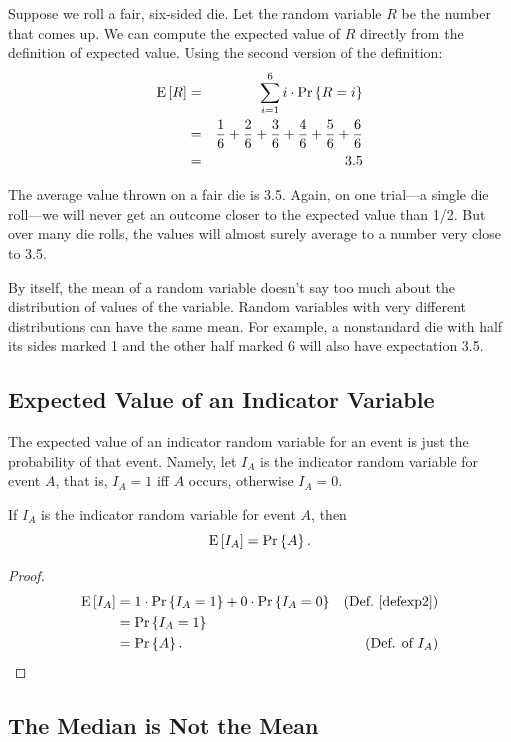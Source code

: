 \documentclass[11pt,twoside]{article}
\begin{document}
Suppose we roll a fair, six-sided die.  Let the random variable $R$ be
the number that comes up.  We can compute the expected value of $R$
directly from the definition of expected value.
Using the second version of the definition:
\begin{eqnarray*}
\mathop{\textup{E}}\nolimits\left[R\right]  & = &   \sum_{i=1}^6 i \cdot \mathop{\textup{Pr}}\nolimits\left\{R = i\right\} \\
        & = &   \frac{1}{6} + \frac{2}{6} + \frac{3}{6} +
                \frac{4}{6} + \frac{5}{6} + \frac{6}{6} \\
        & = &   3.5
\end{eqnarray*}

The average value thrown on a fair die is 3.5.  Again, on one trial---a
single die roll---we will never get an outcome closer to the expected
value than 1/2.  But over many die rolls, the values will almost surely
average to a number very close to 3.5.

By itself, the mean of a random variable doesn't say too much about the
distribution of values of the variable.  Random variables with very
different distributions can have the same mean.  For example, a
nonstandard die with half its sides marked 1 and the other half marked 6
will also have expectation 3.5.

\subsection{Expected Value of an Indicator Variable}

The expected value of an indicator random variable for an event is just
the probability of that event.  Namely, let $I_A$ is the indicator random
variable for event $A$, that is, $I_A = 1$ iff $A$ occurs, otherwise $I_A
= 0$.
\begin{lemma}\label{expindic}
If $I_A$ is the indicator random variable for event $A$, then
\[
\mathop{\textup{E}}\nolimits\left[I_A\right] = \mathop{\textup{Pr}}\nolimits\left\{A\right\}.
\]
\end{lemma}

\begin{proof}
\begin{align*}
\mathop{\textup{E}}\nolimits\left[I_A\right] & =  1 \cdot \mathop{\textup{Pr}}\nolimits\left\{I_A = 1\right\} + 0 \cdot \mathop{\textup{Pr}}\nolimits\left\{I_A = 0\right\} & \text{(Def.~\ref{defexp2})} \\
       & = \mathop{\textup{Pr}}\nolimits\left\{I_A = 1\right\}\\
       & =  \mathop{\textup{Pr}}\nolimits\left\{A\right\}. & \text{(Def. of $I_A$)}
\end{align*}

\end{proof}


\subsection{The Median is Not the Mean}
\end{document}
